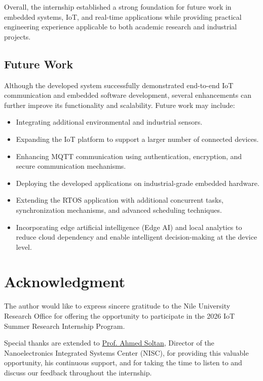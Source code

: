\documentclass[conference]{IEEEtran}
\begin{document}
Overall, the internship established a strong foundation for future work in embedded systems, IoT, and real-time applications while providing practical engineering experience applicable to both academic research and industrial projects.

\subsection{Future Work}

Although the developed system successfully demonstrated end-to-end IoT communication and embedded software development, several enhancements can further improve its functionality and scalability. Future work may include:

\begin{itemize}
    \item Integrating additional environmental and industrial sensors.
    \item Expanding the IoT platform to support a larger number of connected devices.
    \item Enhancing MQTT communication using authentication, encryption, and secure communication mechanisms.
    \item Deploying the developed applications on industrial-grade embedded hardware.
    \item Extending the RTOS application with additional concurrent tasks, synchronization mechanisms, and advanced scheduling techniques.
    \item Incorporating edge artificial intelligence (Edge AI) and local analytics to reduce cloud dependency and enable intelligent decision-making at the device level.
\end{itemize}

\section{Acknowledgment}

The author would like to express sincere gratitude to the Nile University Research Office for offering the opportunity to participate in the 2026 IoT Summer Research Internship Program.

Special thanks are extended to   \href{https://www.nu.edu.eg/academic-staff/dr-ahmed-soltan}{Prof. Ahmed Soltan}, Director of the Nanoelectronics Integrated Systems Center (NISC), for providing this valuable opportunity, his continuous support, and for taking the time to listen to and discuss our feedback throughout the internship.
\end{document}
